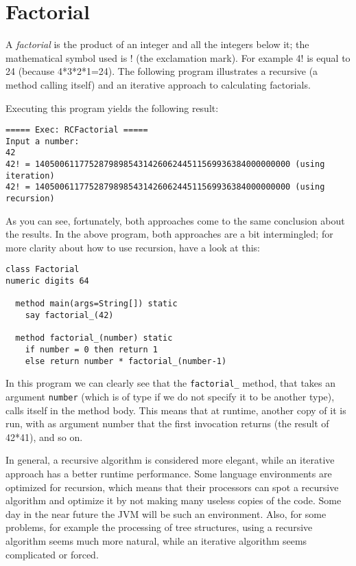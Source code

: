 \section{Factorial}
A \emph{factorial} is the product of an integer and all the integers
below it; the mathematical symbol used is ! (the exclamation mark). For
example 4! is equal to 24 (because 4*3*2*1=24). The
following program illustrates a recursive (a method calling itself)
and an iterative approach to calculating factorials.

Executing this program yields the following result:
\begin{verbatim}
===== Exec: RCFactorial =====
Input a number: 
42
42! = 1405006117752879898543142606244511569936384000000000 (using iteration)
42! = 1405006117752879898543142606244511569936384000000000 (using recursion)
\end{verbatim}
As you can see, fortunately, both approaches come to the same
conclusion about the results. In the above program, both
approaches are a bit intermingled; for more clarity about how to use
recursion, have a look at this:
\begin{lstlisting}[label=factorialrecursive, caption=Factorial Recursive]
class Factorial
numeric digits 64

  method main(args=String[]) static
    say factorial_(42)

  method factorial_(number) static
    if number = 0 then return 1
    else return number * factorial_(number-1)

\end{lstlisting}
In this program we can clearly see that the \texttt{factorial\_} method, that
takes an argument \texttt{number} (which is of type \Rexx{} if we do not
specify it to be another type), calls itself in the method body. This
means that at runtime, another copy of it is run, with as argument
number that the first invocation returns (the result of 42*41), and so
on.

In general, a recursive algorithm is considered more elegant, while an
iterative approach has a better runtime performance. Some language
environments are optimized for recursion, which means that their
processors can spot a recursive algorithm and optimize it by not
making many useless copies of the code. Some day in the near future
the JVM will be such an environment. Also, for some problems, for example
the processing of tree structures, using a recursive algorithm seems
much more natural, while an iterative algorithm seems complicated or forced.
